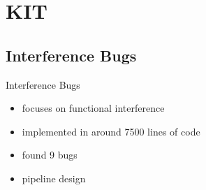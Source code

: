 \section{KIT}
\subsection{Interference Bugs}
\begin{frame}{Interference Bugs}{~}
\begin{minipage}{0.4 \textwidth}
    \begin{itemize}
    \setlength\itemsep{1em}
    \item focuses on functional interference
    \item implemented in around 7500 lines of code 
    \item found 9 bugs
    \item pipeline design
\end{itemize}
\end{minipage}
\begin{minipage}{0.45\textwidth}
    

\end{minipage}
\end{frame}

